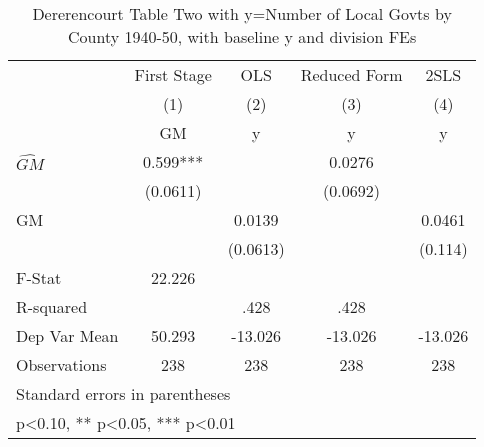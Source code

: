 \begin{table}[htbp]\centering
\def\sym#1{\ifmmode^{#1}\else\(^{#1}\)\fi}
\caption{Dererencourt Table Two with y=Number of Local Govts by County 1940-50, with baseline y and division FEs}
\begin{tabular}{l*{4}{c}}
\toprule
                    & First Stage   &         OLS   &Reduced Form   &        2SLS   \\
                    &\multicolumn{1}{c}{(1)}&\multicolumn{1}{c}{(2)}&\multicolumn{1}{c}{(3)}&\multicolumn{1}{c}{(4)}\\
                    &\multicolumn{1}{c}{GM}&\multicolumn{1}{c}{y}&\multicolumn{1}{c}{y}&\multicolumn{1}{c}{y}\\
\midrule
$\hat{GM}$          &       0.599***&               &      0.0276   &               \\
                    &    (0.0611)   &               &    (0.0692)   &               \\
\addlinespace
GM                  &               &      0.0139   &               &      0.0461   \\
                    &               &    (0.0613)   &               &     (0.114)   \\
\midrule
F-Stat              &      22.226   &               &               &               \\
R-squared           &               &        .428   &        .428   &               \\
Dep Var Mean        &      50.293   &     -13.026   &     -13.026   &     -13.026   \\
Observations        &         238   &         238   &         238   &         238   \\
\bottomrule
\multicolumn{5}{l}{\footnotesize Standard errors in parentheses}\\
\multicolumn{5}{l}{\footnotesize * p<0.10, ** p<0.05, *** p<0.01}\\
\end{tabular}
\end{table}
